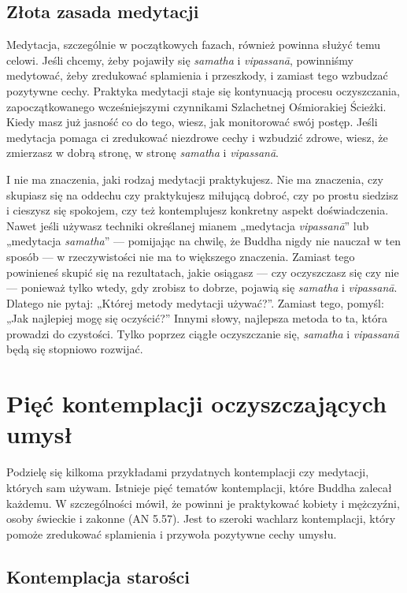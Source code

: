 \documentclass[12pt,openany]{book}
\begin{document}
\section*{Złota zasada medytacji}

Medytacja, szczególnie w początkowych fazach, również po\-win\-na służyć temu celowi. Jeśli chcemy, żeby pojawiły się \textit{samatha} i \textit{vipassanā}, powinniśmy medytować, żeby zredukować splamienia i przeszkody, i zamiast tego wzbudzać pozytywne cechy. Praktyka medytacji staje się kontynuacją procesu oczyszczania, zapoczątkowanego wcześniejszymi czynnikami Szlachetnej Ośmiorakiej Ścieżki. Kiedy masz już jasność co do tego, wiesz, jak monitorować swój postęp. Jeśli medytacja pomaga ci zredukować niezdrowe cechy i wzbudzić zdrowe, wiesz, że zmierzasz w dobrą stro\-nę, w stronę \textit{samatha} i \textit{vipassanā}.

I nie ma znaczenia, jaki rodzaj medytacji praktykujesz. Nie ma znaczenia, czy skupiasz się na oddechu czy praktykujesz miłującą dobroć, czy po prostu siedzisz i cieszysz się spokojem, czy też kontemplujesz konkretny aspekt doświadczenia. Nawet jeśli używasz techniki określanej mianem „medytacja \textit{vipassanā}” lub „medytacja \textit{samatha}” --- pomijając na chwilę, że Buddha nigdy nie nauczał w ten sposób --- w rzeczywistości nie ma to większego znaczenia. Zamiast tego powinieneś skupić się na rezultatach, jakie osiągasz --- czy oczyszczasz się czy nie --- ponieważ tylko wte\-dy, gdy zrobisz to dobrze, pojawią się \textit{samatha} i \textit{vipassanā}. Dlatego nie pytaj: „Której metody medytacji używać?”. Zamiast tego, pomyśl: „Jak najlepiej mogę się oczyścić?” Innymi słowy, najlepsza metoda to ta, która prowadzi do czystości. Tylko poprzez ciągłe oczyszczanie się, \textit{samatha} i \textit{vipassanā} będą się stopniowo rozwijać.

\chapter*{Pięć kontemplacji oczyszczających umysł}

Podzielę się kilkoma przykładami przydatnych kontemplacji czy medytacji, których sam używam. Istnieje pięć tematów kontemplacji, które Buddha zalecał każdemu. W szczególności mówił, że powinni je praktykować kobiety i mężczyźni, osoby świeckie i zakonne (AN 5.57). Jest to szeroki wachlarz kontemplacji, który pomoże zredukować splamienia i przywoła pozytywne cechy umysłu.

\section*{Kontemplacja starości}
\end{document}

